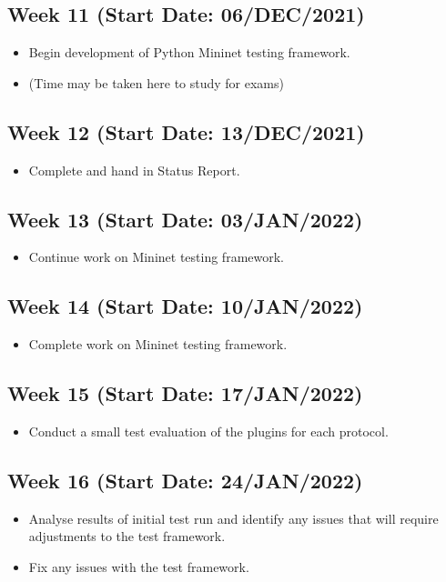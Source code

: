 \documentclass[11pt]{article}
\begin{document}
\subsection{Week 11 (Start Date: 06/DEC/2021)}
\begin{itemize}
    \item Begin development of Python Mininet testing framework.
    \item (Time may be taken here to study for exams)
\end{itemize}
\subsection{Week 12 (Start Date: 13/DEC/2021)}
\begin{itemize}
    \item Complete and hand in Status Report.
\end{itemize}
\subsection{Week 13 (Start Date: 03/JAN/2022)}
\begin{itemize}
    \item Continue work on Mininet testing framework.
\end{itemize}
\subsection{Week 14 (Start Date: 10/JAN/2022)}
\begin{itemize}
    \item Complete work on Mininet testing framework.
\end{itemize}
\subsection{Week 15 (Start Date: 17/JAN/2022)}
\begin{itemize}
    \item Conduct a small test evaluation of the plugins for each protocol.
\end{itemize}
\subsection{Week 16 (Start Date: 24/JAN/2022)}
\begin{itemize}
    \item Analyse results of initial test run and identify any issues that will require adjustments to the test framework.
    \item Fix any issues with the test framework.
\end{itemize}
\end{document}
